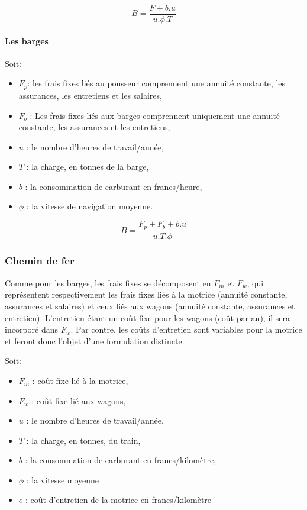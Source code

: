 $$ B = \frac{F+b.u}{u.\phi . T}$$

\paragraph{Les barges}

Soit:

\begin{itemize}
\item $F_p$: les frais fixes liés au pousseur comprennent une annuité
constante, les assurances, les entretiens et les salaires,
\item $F_b$ : Les frais fixes liés aux barges comprennent uniquement une
annuité constante, les assurances et les entretiens,
\item $u$ : le nombre d'heures de travail/année,
\item $T$ : la charge, en tonnes de la barge,
\item $b$ : la consommation de carburant en francs/heure,
\item $\phi$ : la vitesse de navigation moyenne.
\end{itemize}

$$B = \frac{F_p + F_b + b.u}{u.T.\phi}$$

\subsubsection{Chemin de fer}

Comme pour les barges, les frais fixes se décomposent en $F_m$ et $F_w$, qui
représen\-tent respectivement les frais fixes liés à la motrice (annuité
constante, assurances et salaires) et ceux liés aux wagons (annuité constante,
assurances et entretien). L'entretien étant un coût fixe pour les wagons (coût
par an), il sera incorporé dans $F_w$. Par contre, les coûts d'entretien sont
variables pour la motrice et feront donc l'objet d'une formulation distincte.

Soit:

\begin{itemize}
\item $F_m$ : coût fixe lié à la motrice,
\item $F_w$ : coût fixe lié aux wagons,
\item $u$ : le nombre d'heures de travail/année,
\item $T$ : la charge, en tonnes, du train,
\item $b$ : la consommation de carburant en francs/kilomètre,
\item $\phi$ : la vitesse moyenne
\item $e$ : coût d'entretien de la motrice en francs/kilomètre
\end{itemize}



